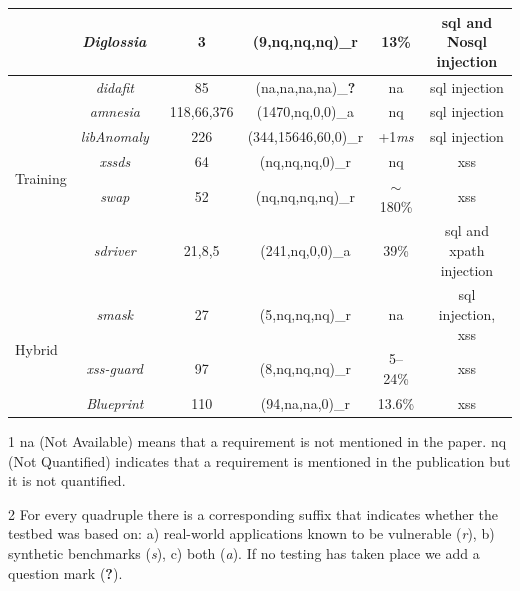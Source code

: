 \documentclass[conference]{IEEEtran}
\newcommand{\xmark}{\ding{56}}
\begin{document}
\begin{landscape}
\begin{table}
\begin{threeparttable}
\begin{small}
{\begin{tabular}{l|c|c|cc|c}
  &   {\it Diglossia}~\cite{SMS13} & 3 & (9,{\sc nq},{\sc nq},{\sc nq})\_r & 13\% & {\sc sql} and No{\sc sql} injection \\
	\hline
	\hline  
  \multirow{6}{*}{Training}
  &   {\it {\sc didafit}}~\cite{LLW02} & 85 & ({\sc na},{\sc na},{\sc na},{\sc na})\_{\bf ?} & {\sc na} & {\sc sql} injection \\
	&   {\it {\sc amnesia}}~\cite{HO05,HO06,HO05b} & 118,66,376 & (1470,{\sc nq},0,0)\_a & {\sc nq} & {\sc sql} injection \\ 
	&   {\it libAnomaly}~\cite{VMV05} & 226 & (344,15646,60,0)\_r & +1{\it ms} & {\sc sql} injection \\
	& 	{\it {\sc xssds}}~\cite{JEP08} & 64 & ({\sc nq},{\sc nq},{\sc nq},0)\_r & {\sc nq} &  {\sc xss} \\
  & 	{\it {\sc swap}}~\cite{WPLKK09} & 52 & ({\sc nq},{\sc nq},{\sc nq},{\sc nq})\_r & $\sim$180\% & {\sc xss} \\ 
	& 	{\it {\sc sd}river}~\cite{MS09,MKS09,MKLS11} & 21,8,5 & (241,{\sc nq},0,0)\_a & 39\% & {\sc sql} and {\sc xp}ath injection \\
  \hline
  \hline
  \multirow{3}{*}{Hybrid}
  &   {\it {\sc sm}ask}~\cite{JB07} & 27 & (5,{\sc nq},{\sc nq},{\sc nq})\_r  & {\sc na} & {\sc sql} injection, {\sc xss} \\
  &   {\it {\sc xss-guard}}~\cite{BV08} & 97 & (8,{\sc nq},{\sc nq},{\sc nq})\_r & 5--24\% & {\sc xss} \\
  &   {\it Blueprint}~\cite{LV09} & 110 & (94,{\sc na},{\sc na},0)\_r & 13.6\% & {\sc xss} \\
	\hline
    \end{tabular}}
    \begin{tablenotes}
	\begin{footnotesize}
       	\item[1] {\sc na} (Not Available) means that a requirement is not mentioned in the paper.
	{\sc nq} (Not Quantified) indicates that a requirement is mentioned in the publication
	but it is not quantified.
		\item[2] For every quadruple there is a corresponding suffix that indicates whether the testbed was
	based on: a) real-world applications known to be vulnerable ({\it r}), b) synthetic benchmarks ({\it s}), c) both ({\it a}).
	If no testing has taken place we add a question mark ({\bf ?}).
	\end{footnotesize}
    \end{tablenotes}
    \end{small}
    \end{threeparttable}
\end{table}
\end{landscape}
\end{document}
